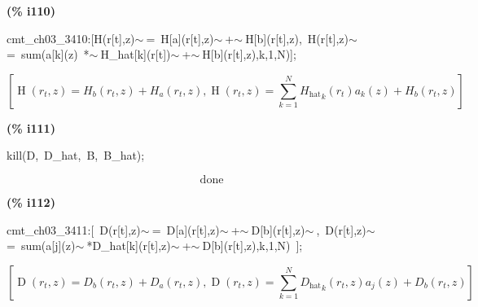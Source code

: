 \documentclass[fleqn]{article}
\begin{document}
\noindent
\begin{minipage}[t]{4.000000em}\color{red}\bfseries
(\% i110)	
\end{minipage}
\begin{minipage}[t]{\textwidth}\color{blue}
cmt\_ch03\_3410:[H(r[t],z)\ensuremath{\sim\ }=\ H[a](r[t],z)\ensuremath{\sim\ }+\ensuremath{\sim\ }H[b](r[t],z),\ H(r[t],z)\ensuremath{\sim\ }=\ sum(a[k](z)\ *\ensuremath{\sim\ }H\_hat[k](r[t])\ensuremath{\sim\ }+\ensuremath{\sim\ }H[b](r[t],z),k,1,N)];
\end{minipage}
\[\displaystyle \tag{cmt\_ ch03\_ 3410} 
\left[ \operatorname{H}\left( {r_t}\operatorname{,}z\right) ={H_b}\left( {r_t}\operatorname{,}z\right) +{H_a}\left( {r_t}\operatorname{,}z\right) \operatorname{,}\operatorname{H}\left( {r_t}\operatorname{,}z\right) =\sum_{k=1}^{N}{\left. {{{H_{\ensuremath{\mathrm{hat}}}}}_k}\left( {r_t}\right)  {a_k}(z)+{H_b}\left( {r_t}\operatorname{,}z\right) \right.}\right] \mbox{}
\]


\noindent
\begin{minipage}[t]{4.000000em}\color{red}\bfseries
(\% i111)	
\end{minipage}
\begin{minipage}[t]{\textwidth}\color{blue}
kill(D,\ D\_hat,\ B,\ B\_hat);
\end{minipage}
\[\displaystyle \tag{\% o111} 
\ensuremath{\mathrm{done}}\mbox{}
\]


\noindent
\begin{minipage}[t]{4.000000em}\color{red}\bfseries
(\% i112)	
\end{minipage}
\begin{minipage}[t]{\textwidth}\color{blue}
cmt\_ch03\_3411:[\ D(r[t],z)\ensuremath{\sim\ }=\ D[a](r[t],z)\ensuremath{\sim\ }+\ensuremath{\sim\ }D[b](r[t],z)\ensuremath{\sim\ },\ D(r[t],z)\ensuremath{\sim\ }=\ sum(a[j](z)\ensuremath{\sim\ }*D\_hat[k](r[t],z)\ensuremath{\sim\ }+\ensuremath{\sim\ }D[b](r[t],z),k,1,N)\ ];
\end{minipage}
\[\displaystyle \tag{cmt\_ ch03\_ 3411} 
\left[ \operatorname{D}\left( {r_t}\operatorname{,}z\right) ={D_b}\left( {r_t}\operatorname{,}z\right) +{D_a}\left( {r_t}\operatorname{,}z\right) \operatorname{,}\operatorname{D}\left( {r_t}\operatorname{,}z\right) =\sum_{k=1}^{N}{\left. {{{D_{\ensuremath{\mathrm{hat}}}}}_k}\left( {r_t}\operatorname{,}z\right)  {a_j}(z)+{D_b}\left( {r_t}\operatorname{,}z\right) \right.}\right] \mbox{}
\]
\end{document}
